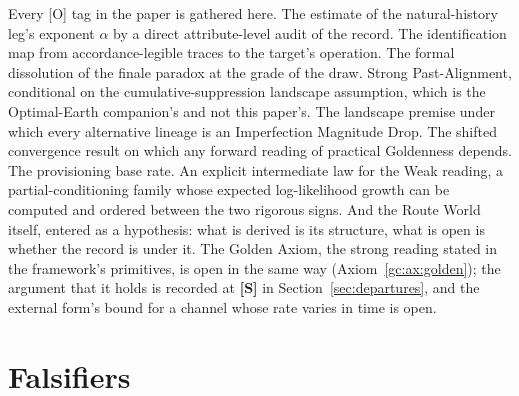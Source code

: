 Every [O] tag in the paper is gathered here. The estimate of the
natural-history leg's exponent $\alpha$ by a direct attribute-level audit
of the record. The identification map from accordance-legible traces to
the target's operation. The formal dissolution of the finale paradox at
the grade of the draw. Strong Past-Alignment, conditional on the
cumulative-suppression landscape assumption, which is the Optimal-Earth
companion's and not this paper's. The landscape premise under which every
alternative lineage is an Imperfection Magnitude Drop. The shifted
convergence result on which any forward reading of practical Goldenness
depends. The provisioning base rate. An explicit intermediate law for the Weak reading, a
partial-conditioning family whose expected log-likelihood growth can be
computed and ordered between the two rigorous signs. And the Route World
itself, entered as a hypothesis: what is derived is its structure, what
is open is whether the record is under it. The Golden Axiom, the strong
reading stated in the framework's primitives, is open in the same way
(Axiom~\ref{gc:ax:golden}); the argument that it holds is
recorded at \textbf{[S]} in Section~\ref{sec:departures}, and the
external form's bound for a channel whose rate varies in time is open.

\section{Falsifiers}\label{sec:falsifiers}

